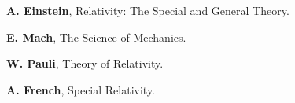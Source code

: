 \documentclass[10pt,fleqn]{article}
\begin{document}
\par {}

\bigskip \smallskip

\par \noindent \textbf{A. Einstein}, Relativity: The Special and General Theory.
\bigskip
\par \noindent \textbf{E. Mach}, The Science of Mechanics.
\bigskip
\par \noindent \textbf{W. Pauli}, Theory of Relativity.
\bigskip
\par \noindent \textbf{A. French}, Special Relativity.

\newpage

\par {}

\smallskip

\par {}

\bigskip \bigskip
\end{document}
